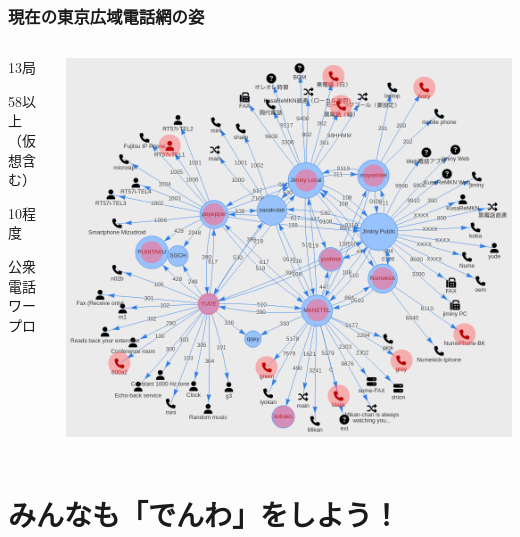 \documentclass[
  lualatex,
  aspectratio=169,
  14pt
]{beamer}
\begin{document}
\begin{frame}
  \frametitle{現在の東京広域電話網の姿}

  \begin{columns}
    \begin{column}{.25\textwidth}
      \begin{description}[labelwidth=\linewidth]
        \item[交換局数]
          13局
        \item[端末数]
          58以上\\
          （仮想含む）
        \item[うち黒電話]
          10程度
        \item[その他]
          公衆電話\\
          ワープロ
      \end{description}
    \end{column}
    \begin{column}{.7\textwidth}
      \centering
      \includegraphics[height=.87\textheight]{./images/mantela2.png}
    \end{column}
  \end{columns}
\end{frame}

\section{みんなも「でんわ」をしよう！}
\end{document}
